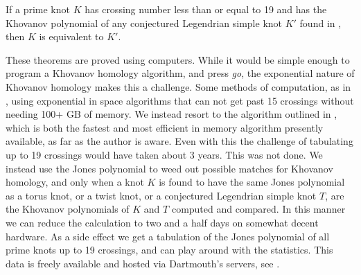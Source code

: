     \begin{theorem}
        If a prime knot $K$ has crossing number less than or equal to 19 and
        has the Khovanov polynomial of any conjectured
        Legendrian simple knot $K'$ found
        in \cite{LegendrianKnotAtlas}, then $K$ is equivalent to $K'$.
    \end{theorem}
    These theorems are proved using computers. While it would be simple enough
    to program a Khovanov homology algorithm, and press \textit{go},
    the exponential nature of Khovanov homology makes this a challenge.
    Some methods of computation, as in \cite{sage}, using exponential in
    space algorithms that can not get past 15 crossings without needing 100+ GB
    of memory. We instead resort to the algorithm outlined in
    \cite{BarNatan2006FASTKH}, which is both the fastest and most efficient
    in memory algorithm presently available, as far as the author is aware.
    Even with this the challenge of tabulating up to 19 crossings would have
    taken about 3 years. This was not done. We instead use the Jones polynomial
    to weed out possible matches for Khovanov homology, and only when a knot $K$
    is found to have the same Jones polynomial as a torus knot, or a twist knot,
    or a conjectured Legendrian simple knot $T$, are the Khovanov polynomials
    of $K$ and $T$ computed and compared. In this manner we can reduce the
    calculation to two and a half days on somewhat decent hardware. As a side
    effect we get a tabulation of the Jones polynomial of all prime knots up
    to 19 crossings, and can play around with the statistics. This data is
    freely available and hosted via Dartmouth's servers, see
    \cite{JonesData}.
